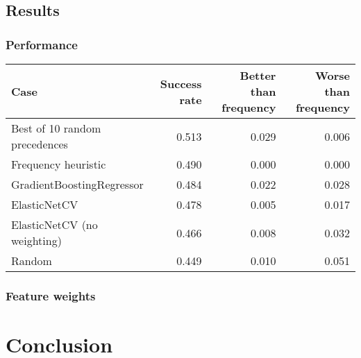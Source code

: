 \subsection{Results}

\subsubsection{Performance}

\begin{tabular}{lrrr}
	Case & Success rate & Better than frequency & Worse than frequency \\
	\hline
	Best of 10 random precedences & 0.513 & 0.029 & 0.006 \\
	Frequency heuristic & 0.490 & 0.000 & 0.000 \\
	GradientBoostingRegressor & 0.484 & 0.022 & 0.028 \\
	ElasticNetCV & 0.478 & 0.005 & 0.017 \\
	ElasticNetCV (no weighting) & 0.466 & 0.008 & 0.032 \\
	Random & 0.449 & 0.010 & 0.051 \\
\end{tabular}


\subsubsection{Feature weights}


\section{Conclusion}


\glsaddall
\printglossaries





